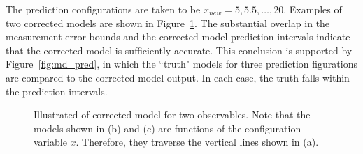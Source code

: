 The prediction configurations are taken to be $x_{new} = 5, 5.5, \ldots, 20$. 
Examples of two corrected models are shown in Figure~\ref{fig:md_corr}. The
substantial overlap in the measurement error bounds and the corrected model
prediction intervals indicate that the corrected model is sufficiently accurate.
This conclusion is supported by Figure~\ref{fig:md_pred}, in which the
``truth" models for three prediction figurations are compared to the corrected
model output. In each case, the truth falls within the prediction intervals.

\begin{figure}[htbp]
\begin{center}
\end{center}
  \begin{subfigmatrix}{2}
  \end{subfigmatrix}
  \caption{Illustrated of corrected model for two observables. Note that the models shown in (b) and (c) are functions of the configuration variable $x$. Therefore, they traverse the vertical lines shown in (a).}
\label{fig:md_corr}
\end{figure}

